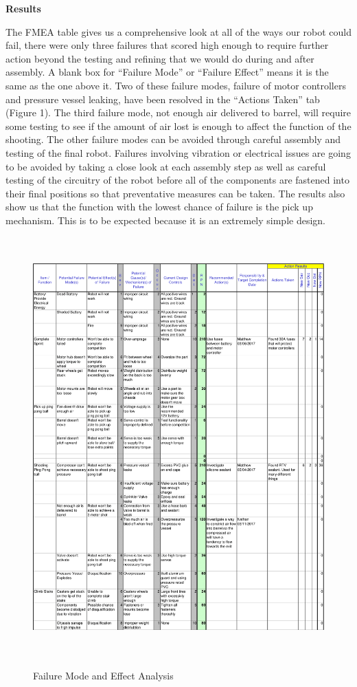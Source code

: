 \documentclass[12pt,letterpaper,titlepage]{article}
\begin{document}
\smallskip\noindent\textbf{Results}

The FMEA table gives us a comprehensive look at all of the ways our robot could fail, there were only three failures that scored high enough to require further action beyond the testing and refining that we would do during and after assembly. A blank box for “Failure Mode” or “Failure Effect” means it is the same as the one above it. Two of these failure modes, failure of motor controllers and pressure vessel leaking, have been resolved in the “Actions Taken” tab (Figure 1).  The third failure mode, not enough air delivered to barrel, will require some testing to see if the amount of air lost is enough to affect the function of the shooting. The other failure modes can be avoided through careful assembly and testing of the final robot. Failures involving vibration or electrical issues are going to be avoided by taking a close look at each assembly step as well as careful testing of the circuitry of the robot before all of the components are fastened into their final positions so that preventative measures can be taken. The results also show us that the function with the lowest chance of failure is the pick up mechanism. This is to be expected because it is an extremely simple design. 

\begin{figure}[H]
	\centering
	\includegraphics[height=6.35in, width=6in]{images/FMEA}
	\label{fig:FMEA}
	\caption{Failure Mode and Effect Analysis}
\end{figure}
\end{document}
